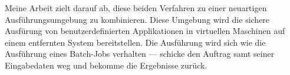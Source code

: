 Meine Arbeit zielt  darauf ab, diese beiden Verfahren  zu einer neuartigen
Ausf\"{u}hrungsumgebung zu  kombinieren.  Diese Umgebung  wird die sichere
Ausf\"{u}rung   von   benutzerdefinierten   Applikationen  in   virtuellen
Maschinen auf  einem entfernten System  bereitstellen.  Die Ausf\"{u}hrung
wird sich  wie die Ausf\"{u}hrung  eines Batch-Jobs verhalten  --- schicke
den  Auftrag  samt seiner  Eingabedaten  weg  und  bekomme die  Ergebnisse
zur\"{u}ck.








  
  
